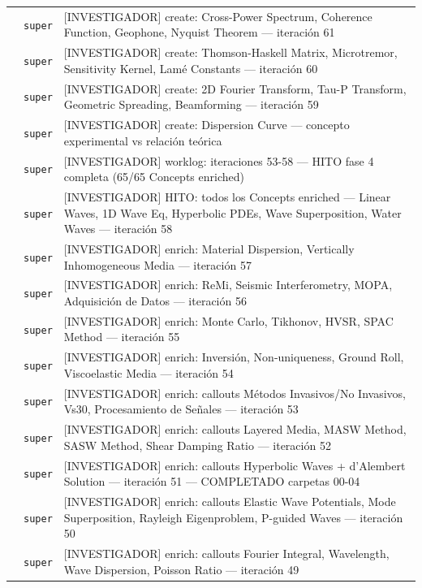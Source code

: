 \begin{longtable}{@{}p{1.7cm} p{1.5cm} p{12.2cm}@{}}
 & \texttt{\scriptsize super} & [INVESTIGADOR] create: Cross-Power Spectrum, Coherence Function, Geophone, Nyquist Theorem --- iteración 61 \\
 & \texttt{\scriptsize super} & [INVESTIGADOR] create: Thomson-Haskell Matrix, Microtremor, Sensitivity Kernel, Lamé Constants --- iteración 60 \\
 & \texttt{\scriptsize super} & [INVESTIGADOR] create: 2D Fourier Transform, Tau-P Transform, Geometric Spreading, Beamforming --- iteración 59 \\
 & \texttt{\scriptsize super} & [INVESTIGADOR] create: Dispersion Curve --- concepto experimental vs relación teórica \\
 & \texttt{\scriptsize super} & [INVESTIGADOR] worklog: iteraciones 53-58 --- HITO fase 4 completa (65/65 Concepts enriched) \\
 & \texttt{\scriptsize super} & [INVESTIGADOR] HITO: todos los Concepts enriched --- Linear Waves, 1D Wave Eq, Hyperbolic PDEs, Wave Superposition, Water Waves --- iteración 58 \\
 & \texttt{\scriptsize super} & [INVESTIGADOR] enrich: Material Dispersion, Vertically Inhomogeneous Media --- iteración 57 \\
 & \texttt{\scriptsize super} & [INVESTIGADOR] enrich: ReMi, Seismic Interferometry, MOPA, Adquisición de Datos --- iteración 56 \\
 & \texttt{\scriptsize super} & [INVESTIGADOR] enrich: Monte Carlo, Tikhonov, HVSR, SPAC Method --- iteración 55 \\
 & \texttt{\scriptsize super} & [INVESTIGADOR] enrich: Inversión, Non-uniqueness, Ground Roll, Viscoelastic Media --- iteración 54 \\
 & \texttt{\scriptsize super} & [INVESTIGADOR] enrich: callouts Métodos Invasivos/No Invasivos, Vs30, Procesamiento de Señales --- iteración 53 \\
 & \texttt{\scriptsize super} & [INVESTIGADOR] enrich: callouts Layered Media, MASW Method, SASW Method, Shear Damping Ratio --- iteración 52 \\
 & \texttt{\scriptsize super} & [INVESTIGADOR] enrich: callouts Hyperbolic Waves + d'Alembert Solution --- iteración 51 --- COMPLETADO carpetas 00-04 \\
 & \texttt{\scriptsize super} & [INVESTIGADOR] enrich: callouts Elastic Wave Potentials, Mode Superposition, Rayleigh Eigenproblem, P-guided Waves --- iteración 50 \\
 & \texttt{\scriptsize super} & [INVESTIGADOR] enrich: callouts Fourier Integral, Wavelength, Wave Dispersion, Poisson Ratio --- iteración 49 \\

\end{longtable}
